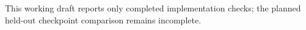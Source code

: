 This working draft reports only completed implementation checks; the planned held-out checkpoint comparison remains incomplete.
